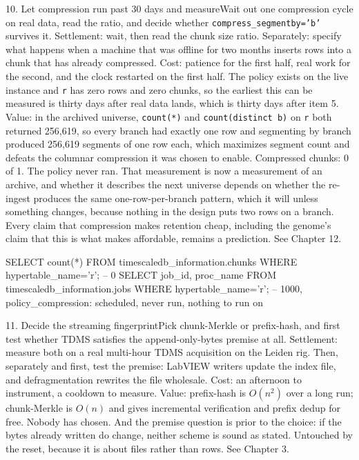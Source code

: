 \begin{Open}{10. Let compression run past 30 days and measure}{Wait out one compression cycle on real data, read the ratio, and decide whether \texttt{compress\_segmentby='b'} survives it.}
Settlement: wait, then read the chunk size ratio. Separately: specify what happens when a machine that was offline for two months inserts rows into a chunk that has already compressed. Cost: patience for the first half, real work for the second, and the clock restarted on the first half. The policy exists on the live instance and \texttt{r} has zero rows and zero chunks, so the earliest this can be measured is thirty days after real data lands, which is thirty days after item 5. Value: in the archived universe, \texttt{count(*)} and \texttt{count(distinct b)} on \texttt{r} both returned 256,619, so every branch had exactly one row and segmenting by branch produced 256,619 segments of one row each, which maximizes segment count and defeats the columnar compression it was chosen to enable. Compressed chunks: 0 of 1. The policy never ran. That measurement is now a measurement of an archive, and whether it describes the next universe depends on whether the re-ingest produces the same one-row-per-branch pattern, which it will unless something changes, because nothing in the design puts two rows on a branch. Every claim that compression makes retention cheap, including the genome's claim that this is what makes  affordable, remains a prediction. See Chapter 12.
\begin{Check}
SELECT count(*) FROM timescaledb_information.chunks WHERE hypertable_name='r';  -- 0
SELECT job_id, proc_name FROM timescaledb_information.jobs WHERE hypertable_name='r';
  -- 1000, policy_compression: scheduled, never run, nothing to run on
\end{Check}
\end{Open}

\begin{Open}{11. Decide the streaming fingerprint}{Pick chunk-Merkle or prefix-hash, and first test whether TDMS satisfies the append-only-bytes premise at all.}
Settlement: measure both on a real multi-hour TDMS acquisition on the Leiden rig. Then, separately and first, test the premise: LabVIEW writers update the index file, and defragmentation rewrites the file wholesale. Cost: an afternoon to instrument, a cooldown to measure. Value: prefix-hash is $O(n^2)$ over a long run; chunk-Merkle is $O(n)$ and gives incremental verification and prefix dedup for free. Nobody has chosen. And the premise question is prior to the choice: if the bytes already written do change, neither scheme is sound as stated. Untouched by the reset, because it is about files rather than rows. See Chapter 3.
\end{Open}

